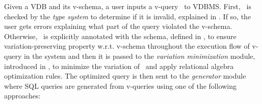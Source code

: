 Given a VDB and its v-schema, a user inputs a v-query \vQ\ to VDBMS.
%
First, \vQ\ is checked by the \emph{type system} to determine if it is invalid, explained in 
. 
If so, the user gets errors explaining what part of the 
query violated the v-schema.
Otherwise, 
\vQ\ is explicitly annotated with the schema,
defined in ,
to ensure variation-preserving property w.r.t. v-schema throughout the execution flow of v-query 
in the system and then
%
it is passed to the \emph{variation minimization} module, introduced in 
, to minimize the variation of \vQ\ and apply
relational algebra optimization rules. 
%
The optimized query is then sent to the \emph{generator} module where
SQL queries are generated from v-queries using one of the following approaches:
